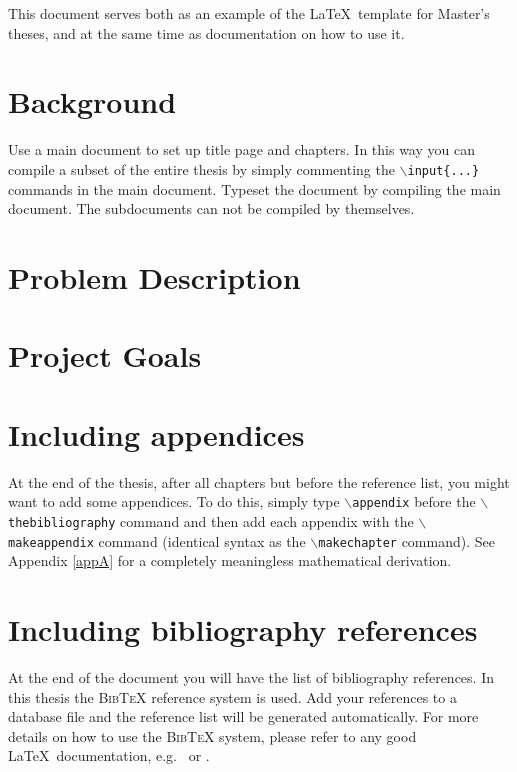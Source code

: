 This document serves both as an example of the \LaTeX\ template
for Master's theses, and at the same time as documentation
on how to use it.

\section{Background}
Use a main document to set up title page and chapters. In this way
you can compile a subset of the entire thesis by simply commenting
the \texttt{$\backslash$input\{...\}} commands in the main document.
Typeset the document by compiling the main document. The
subdocuments can not be compiled by themselves.

\section{Problem Description}

\section{Project Goals}

\section{Including appendices}
At the end of the thesis, after all chapters but before the
reference list, you might want to add some appendices. To do this,
simply type \texttt{$\backslash$appendix} before the
\texttt{$\backslash$thebibliography} command and then add each
appendix with the \texttt{$\backslash$makeappendix} command
(identical syntax as the \texttt{$\backslash$makechapter}
command). See Appendix \ref{appA} for a completely meaningless
mathematical derivation.

\section{Including bibliography references}
At the end of the document you will have the list of bibliography
references. In this thesis the \textsc{BibTeX} reference system is
used. Add your references to a database file and the reference
list will be generated automatically. For more details on how to
use the \textsc{BibTeX} system, please refer to any good \LaTeX\
documentation, e.g.\ \cite{Lamport} or \cite{Goossens}.\nocite{*}
